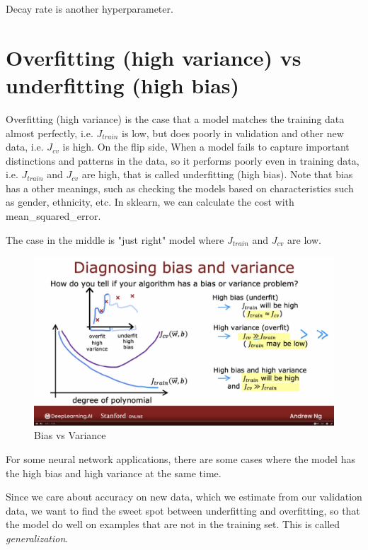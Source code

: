 \documentclass[12pt]{report}
\begin{document}
Decay rate is another hyperparameter.

\section{Overfitting (high variance) vs underfitting (high bias)}
Overfitting (high variance) is the case that a model matches the training data almost perfectly, i.e.  $J_{train}$ is low, but does poorly in validation and other new data, i.e. $J_{cv}$ is high. On the flip side, When a model fails to capture important distinctions and patterns in the data, so it performs poorly even in training data, i.e. $J_{train}$ and $J_{cv}$ are high, that is called underfitting (high bias). Note that bias has a other meanings, such as checking the models based on characteristics such as gender, ethnicity, etc. In sklearn, we can calculate the cost with mean\_squared\_error.


The case in the middle is "just right" model where $J_{train}$ and $J_{cv}$ are low.

\begin{figure}[H]
  \centering
  \caption{Bias vs Variance}
  \includegraphics[trim =0.0cm 0.0cm 0.0cm 0.0cm, clip, scale=0.12]{pics/biasVariance.png}
\end{figure}

For some neural network applications, there are some cases where the model has the high bias and high variance at the same time.


Since we care about accuracy on new data, which we estimate from our validation data, we want to find the sweet spot between underfitting and overfitting, so that the model do well on examples that are not in the training set. This is called \textit{generalization}.
\end{document}
